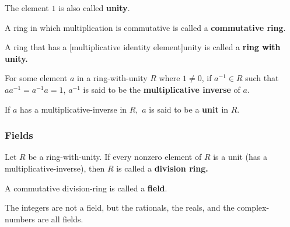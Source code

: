 \documentclass{article}
\begin{document}
\begin{definition}[unity]
The element $1$ is also called \textbf{unity}.
\end{definition}

\begin{definition}
A \@{ring} in which multiplication is commutative is called a \textbf{commutative ring}.
\end{definition}

\begin{definition}
A \@{ring} that has a \@[multiplicative identity element]{unity} is called a \textbf{ring with unity.}
\end{definition}

\begin{definition}
For some element $a$ in a \@{ring-with-unity} $R$ where $1 \neq 0$, if $a^{-1} \in R$ such that $aa^{-1} = a^{-1}a = 1$, $a^{-1}$ is said to be the \textbf{multiplicative inverse} of $a.$
\end{definition}

\begin{definition}[Unit]
If $a$ has a \@{multiplicative-inverse} in $R,$ $a$ is said to be a \textbf{unit} in $R$.
\end{definition}

\subsubsection{Fields}

\begin{definition}
Let $R$ be a \@{ring-with-unity}. If every nonzero element of $R$ is a \@{unit} (has a \@{multiplicative-inverse}), then $R$ is called a \textbf{division ring.}
\end{definition}

\begin{definition}[Field]
A commutative \@{division-ring} is called a \textbf{field}.
\end{definition}

\begin{example}
The \@{integers} are not a \@{field}, but the \@{rationals}, the \@{reals}, and the \@{complex-numbers} are all fields.
\end{example}
\end{document}
